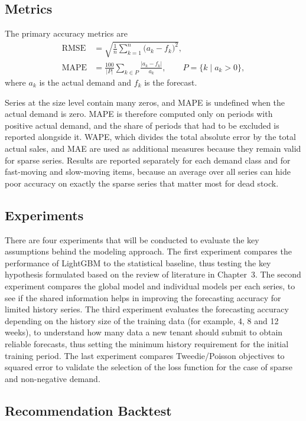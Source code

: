 \documentclass{StockSense}
\begin{document}
\subsection{Metrics}

The primary accuracy metrics are
\begin{align}
    \mathrm{RMSE} &= \sqrt{\frac{1}{n}\sum_{k=1}^{n}\big(a_k - f_k\big)^2}, \\
    \mathrm{MAPE} &= \frac{100}{|P|}\sum_{k \in P}\frac{|a_k - f_k|}{a_k}, \qquad P = \{k \mid a_k > 0\},
\end{align}
where $a_k$ is the actual demand and $f_k$ is the forecast.

Series at the size level contain many zeros, and MAPE is undefined when the actual demand is zero. MAPE is therefore computed only on periods with positive actual demand, and the share of periods that had to be excluded is reported alongside it. WAPE, which divides the total absolute error by the total actual sales, and MAE are used as additional measures because they remain valid for sparse series. Results are reported separately for each demand class and for fast-moving and slow-moving items, because an average over all series can hide poor accuracy on exactly the sparse series that matter most for dead stock.

\subsection{Experiments}

There are four experiments that will be conducted to evaluate the key assumptions behind the modeling approach. The first experiment compares the performance of LightGBM to the statistical baseline, thus testing the key hypothesis formulated based on the review of literature in Chapter~3. The second experiment compares the global model and individual models per each series, to see if the shared information helps in improving the forecasting accuracy for limited history series. The third experiment evaluates the forecasting accuracy depending on the history size of the training data (for example, 4, 8 and 12 weeks), to understand how many data a new tenant should submit to obtain reliable forecasts, thus setting the minimum history requirement for the initial training period. The last experiment compares Tweedie/Poisson objectives to squared error to validate the selection of the loss function for the case of sparse and non-negative demand.

\subsection{Recommendation Backtest}
\end{document}
